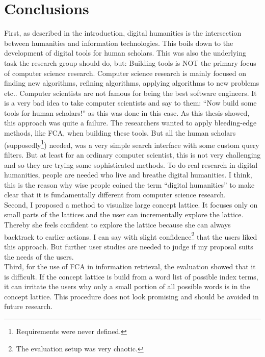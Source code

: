 \documentclass[11pt]{report}
\begin{document}
\chapter{Conclusions}
\label{Conclusions}

First, as described in the introduction, digital humanities is the intersection between humanities and information technologies. This boils down to the development of digital tools for human scholars. This was also the underlying task the research group should do, but: Building tools is NOT the primary focus of computer science research. Computer science research is mainly focused on finding new algorithms, refining algorithms, applying algorithms to new problems etc.. Computer scientists are not famous for being the best software engineers. It is a very bad idea to take computer scientists and say to them: ``Now build some tools for human scholars!'' as this was done in this case. As this thesis showed, this approach was quite a failure. The researchers wanted to apply bleeding-edge methods, like FCA, when building these tools. But all the human scholars (supposedly\footnote{Requirements were never defined.}) needed, was a very simple search interface with some custom query filters. But at least for an ordinary computer scientist, this is not very challenging and so they are trying some sophisticated methods. To do real research in digital humanities, people are needed who live and breathe digital humanities. I think, this is the reason why wise people coined the term ``digital humanities'' to make clear that it is fundamentally different from computer science research. \\

Second, I proposed a method to visualize large concept lattice. It focuses only on small parts of the lattices and the user can incrementally explore the lattice. Thereby she feels confident to explore the lattice because she can always backtrack to earlier actions. I can say with slight confidence\footnote{The evaluation setup was very chaotic.} that the users liked this approach. But further user studies are needed to judge if my proposal suits the needs of the users. \\

Third, for the use of FCA in information retrieval, the evaluation showed that it is difficult. If the concept lattice is build from a word list of possible index terms, it can irritate the users why only a small portion of all possible words is in the concept lattice. This procedure does not look promising and should be avoided in future research.
\newpage


\end{document}
